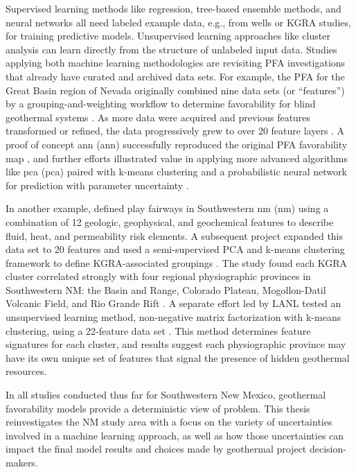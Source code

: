 Supervised learning methods like regression, tree-based ensemble methods, and neural networks all need labeled example data, e.g., from wells or KGRA studies, for training predictive models. Unsupervised learning approaches like cluster analysis can learn directly from the structure of unlabeled input data. Studies applying both machine learning methodologies are revisiting PFA investigations that already have curated and archived data sets. For example, the PFA for the Great Basin region of Nevada originally combined nine data sets (or ``features'') by a grouping-and-weighting workflow to determine favorability for blind geothermal systems \citep{faulds_progress_2017}. As more data were acquired and previous features transformed or refined, the data progressively grew to over 20 feature layers \citep{brown_machine_2020, faulds_discovering_2019}. A proof of concept \acrlong{ann} (\acrshort{ann}) successfully reproduced the original PFA favorability map \citep{brown_machine_2020}, and further efforts illustrated value in applying more advanced algorithms like \acrlong{pca} (\acrshort{pca}) paired with k-means clustering \citep{smith_characterizing_2021} and a probabilistic neural network for prediction with parameter uncertainty \citep{brown_personal_2021}.

In another example, \citet{bielicki_hydrogeolgic_2015} defined play fairways in Southwestern \acrlong{nm} (\acrshort{nm}) using a combination of 12 geologic, geophysical, and geochemical features to describe fluid, heat, and permeability risk elements. A subsequent project expanded this data set to 20 features and used a semi-supervised PCA and k-means clustering framework to define KGRA-associated groupings \citep{pepin_new_2019}. The study found each KGRA cluster correlated strongly with four regional physiographic provinces in Southwestern NM: the Basin and Range, Colorado Plateau, Mogollon-Datil Volcanic Field, and Rio Grande Rift \citep{pepin_new_2019}. A separate effort led by LANL tested an unsupervised learning method, non-negative matrix factorization with k-means clustering, using a 22-feature data set \citep{vesselinov_discovering_2020}. This method determines feature signatures for each cluster, and results suggest each physiographic province may have its own unique set of features that signal the presence of hidden geothermal resources. 

In all studies conducted thus far for Southwestern New Mexico, geothermal favorability models provide a deterministic view of problem. This thesis reinvestigates the NM study area with a focus on the variety of uncertainties involved in a machine learning approach, as well as how those uncertainties can impact the final model results and choices made by geothermal project decision-makers.

